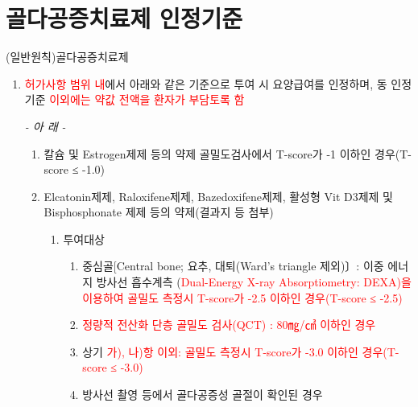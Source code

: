 ﻿\section{골다공증치료제 인정기준}

\begin{commentbox}{(일반원칙)골다공증치료제}
\begin{enumerate}[1.]\tightlist
\item \textcolor{red}{허가사항 범위 내}에서 아래와 같은 기준으로 투여 시 요양급여를 인정하며, 동 인정기준 \textcolor{red}{이외에는 약값 전액을 환자가 부담토록 함}\newline
\begin{center}\emph{- 아 래 -}\end{center}
	\begin{enumerate}[가.]\tightlist
	\item 칼슘 및 Estrogen제제 등의 약제 골밀도검사에서 T-score가 -1 이하인 경우(T-score ≤ -1.0)
	\item Elcatonin제제, Raloxifene제제, Bazedoxifene제제, 활성형 Vit D3제제 및 Bisphosphonate 제제 등의 약제(결과지 등 첨부)
		\begin{enumerate}[1)]\tightlist
		\item 투여대상
			\begin{enumerate}[가)]\tightlist
			\item 중심골[Central bone; 요추, 대퇴(Ward's triangle 제외)〕: 이중 에너지 방사선 흡수계측 (\textcolor{red}{Dual-Energy X-ray Absorptiometry: DEXA)을 이용하여 골밀도 측정시 T-score가 -2.5 이하인 경우(T-score ≤ -2.5)}
			\item \textcolor{red}{정량적 전산화 단층 골밀도 검사(QCT) : 80㎎/㎤ 이하인 경우}
			\item 상기 \textcolor{red}{가), 나)항 이외: 골밀도 측정시 T-score가 -3.0 이하인 경우(T-score ≤ -3.0)}
			\item 방사선 촬영 등에서 골다공증성 골절이 확인된 경우
			\end{enumerate}

\end{enumerate}
\end{enumerate}
\end{enumerate}
\end{commentbox}
